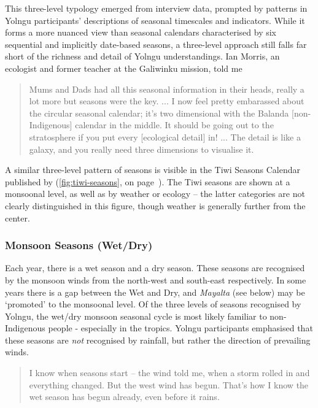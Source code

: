 This three-level typology emerged from interview data, prompted by patterns
in Yolngu participants' descriptions of seasonal timescales and indicators.
While it forms a more nuanced view than seasonal calendars characterised by
six sequential and implicitly date-based seasons, a three-level approach still
falls far short of the richness and detail of Yolngu understandings.
%
Ian Morris, an ecologist and former teacher at the Galiwinku mission, told me
\begin{quote}
    Mums and Dads had all this seasonal information in their heads, really
    a lot more but seasons were the key. ...  I now feel pretty embarassed
    about the circular seasonal calendar; it's two dimensional with the Balanda
    [non-Indigenous] calendar in the middle.  It should be going out to the
    stratosphere if you put every [ecological detail] in! ... The detail is
    like a galaxy, and you really need three dimensions to visualise it.
\end{quote}

A similar three-level pattern of seasons is visible in the Tiwi Seasons Calendar
published by \citet{CSIROcals} (\cref{fig:tiwi-seasons}, on
page~\pageref{fig:tiwi-seasons}).  The Tiwi seasons are shown at a monsoonal
level, as well as by weather or ecology -- the latter categories are not clearly
distinguished in this figure, though weather is generally further from the center.


\subsubsection{Monsoon Seasons (Wet/Dry)}

Each year, there is a wet season and a dry season.  These seasons are
recognised by the monsoon winds from the north-west and south-east
respectively.  In some years there is a gap between the Wet and Dry, and
\textit{Mayalta} (see below) may be `promoted' to the monsoonal level.
%
Of the three levels of seasons recognised by Yolngu, the wet/dry monsoon
seasonal cycle is most likely familiar to non-Indigenous people - especially
in the tropics.  Yolngu participants emphasised that these seasons are
\emph{not} recognised by rainfall, but rather the direction of prevailing winds.
\begin{quote}
    I know when seasons start -- the wind told me, when a storm rolled in
    and everything changed.  But the west wind has begun.  That's how I
    know the wet season has begun already, even before it rains.
\end{quote}

